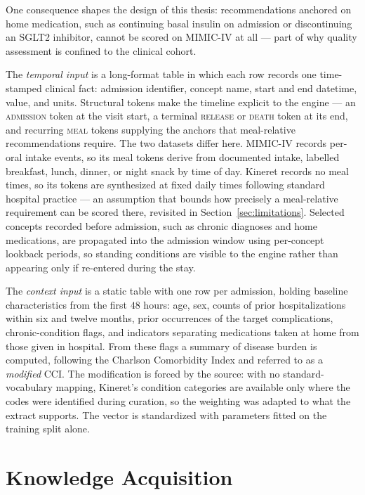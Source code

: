 One consequence shapes the design of this thesis: recommendations anchored on home medication, such as continuing basal insulin on admission or discontinuing an SGLT2 inhibitor, cannot be scored on MIMIC-IV at all --- part of why quality assessment is confined to the clinical cohort.

The \emph{temporal input} is a long-format table in which each row records one time-stamped clinical fact: admission identifier, concept name, start and end datetime, value, and units. Structural tokens make the timeline explicit to the engine --- an \textsc{admission} token at the visit start, a terminal \textsc{release} or \textsc{death} token at its end, and recurring \textsc{meal} tokens supplying the anchors that meal-relative recommendations require. The two datasets differ here. MIMIC-IV records per-oral intake events, so its meal tokens derive from documented intake, labelled breakfast, lunch, dinner, or night snack by time of day. Kineret records no meal times, so its tokens are synthesized at fixed daily times following standard hospital practice --- an assumption that bounds how precisely a meal-relative requirement can be scored there, revisited in Section~\ref{sec:limitations}. Selected concepts recorded before admission, such as chronic diagnoses and home medications, are propagated into the admission window using per-concept lookback periods, so standing conditions are visible to the engine rather than appearing only if re-entered during the stay.

The \emph{context input} is a static table with one row per admission, holding baseline characteristics from the first $48$ hours: age, sex, counts of prior hospitalizations within six and twelve months, prior occurrences of the target complications, chronic-condition flags, and indicators separating medications taken at home from those given in hospital. From these flags a summary of disease burden is computed, following the Charlson Comorbidity Index and referred to as a \emph{modified} CCI. The modification is forced by the source: with no standard-vocabulary mapping, Kineret's condition categories are available only where the codes were identified during curation, so the weighting was adapted to what the extract supports. The vector is standardized with parameters fitted on the training split alone.

\section{Knowledge Acquisition}

